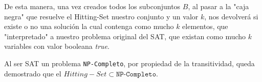 De esta manera, una vez creados todos los subconjuntos $B$, al pasar a la "caja negra" que resuelve el Hitting-Set nuestro conjunto y un valor $k$, nos devolverá si existe o no una solución la cual contenga como mucho $k$ elementos, que "interpretado" a nuestro problema original del SAT, que existan como mucho $k$ variables con valor booleana \textit{true}.

Al ser SAT un problema \texttt{NP-Completo}, por propiedad de la transitividad, queda demostrado que el $Hitting-Set \subset \texttt{NP-Completo}$.
